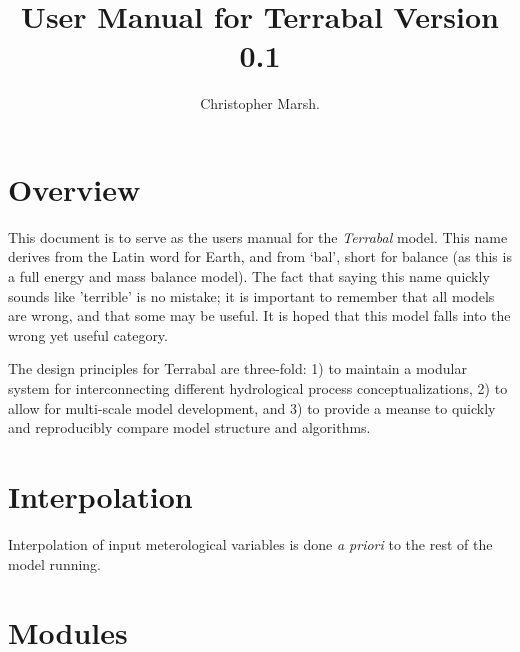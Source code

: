 \documentclass[12pt]{article}
\title{User Manual for Terrabal  Version 0.1 }
\author{Christopher Marsh.}
\begin{document}
\maketitle
\clearpage
\section{Overview}

This document is to serve as the users manual for the \textit{Terrabal} model. This name derives from the Latin word for Earth, and from `bal', short for balance (as this is a full energy and mass balance model). The fact that saying this name quickly sounds like 'terrible' is no mistake; it is important to remember that all models are wrong, and that some may be useful. It is hoped that this model falls into the wrong yet useful category.

The design principles for Terrabal are three-fold: 1) to maintain a modular system for interconnecting different hydrological process conceptualizations, 2) to allow for multi-scale model development, and 3) to provide a meanse to quickly and reproducibly compare model structure and algorithms. 

\section{Interpolation}

Interpolation of input meterological variables is done \textit{a priori} to the rest of the model running. 


\section{Modules}
Hydrological process conceptualizations are written into modules. Each module has a set of pre- and post-conditions that denote which variables are required and which are provided. Modules dependencies are then determined at runtime. Further, modules may be either 'element-parallel' or 'domain-parallel'. All element-parallel modules only require a single element with no dependency upon other elements, and can be batched together in a parallel pipeline, fullfilling dependency order. Domain-parallel requires elements to known other elements properties, and thus must be run separate. 




\section{Variable names}
In order to present a standar way of accessing variable names, a map of internal to external names is used. These are case sensitive.
\end{document}
